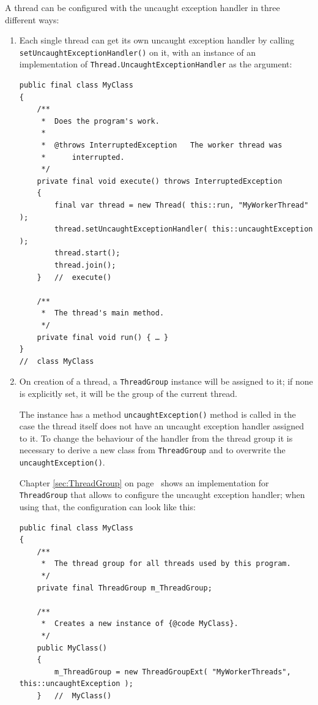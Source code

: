 \documentclass[11pt,a4paper, titlepage, parskip=half, headsepline, footsepline, cleardoublepage=current, headheight=1cm]{scrbook}
\newcommand*{\tqvref}[1]{\hyperref[{#1}]{\ref*{#1}} on page~\pageref{#1}}
\begin{document}
A thread can be configured with the uncaught exception handler in three different ways:
\begin{enumerate}
\item{Each single thread can get its own uncaught exception handler by calling \lstinline|setUncaughtExceptionHandler()|\autocite{ORACLE_DOC_THREAD:setUncaughtExceptionHandler} on it, with an instance of an implementation of \lstinline|Thread.UncaughtExceptionHandler| as the argument:
\begin{lstlisting}
public final class MyClass
{
    /**
     *  Does the program's work.
     *
     *  @throws InterruptedException   The worker thread was
     *      interrupted.
     */
    private final void execute() throws InterruptedException
    {
        final var thread = new Thread( this::run, "MyWorkerThread" );
        thread.setUncaughtExceptionHandler( this::uncaughtException );
        thread.start();
        thread.join();
    }   //  execute()
     
    /**
     *  The thread's main method.
     */
    private final void run() { … }
}
//  class MyClass
\end{lstlisting}
}
\item{On creation of a thread, a \lstinline|ThreadGroup|\autocite{ORACLE_DOC_THREADGROUP_CLASS} instance will be assigned to it; if none is explicitly set, it will be the group of the current thread.

The instance has a method \lstinline|uncaughtException()|\autocite{ORACLE_DOC_THREADGROUP:uncaughtException} method is called in the case the thread itself does not have an uncaught exception handler assigned to it. To change the behaviour of the handler from the thread group it is necessary to derive a new class from \lstinline|ThreadGroup| and to overwrite the \lstinline|uncaughtException()|.

Chapter \tqvref{sec:ThreadGroup} shows an implementation for \lstinline|ThreadGroup| that allows to configure the uncaught exception handler; when using that, the configuration can look like this:
\begin{lstlisting}
public final class MyClass
{
    /**
     *  The thread group for all threads used by this program.
     */
    private final ThreadGroup m_ThreadGroup;
    
    /**
     *  Creates a new instance of {@code MyClass}.
     */
    public MyClass()
    {
        m_ThreadGroup = new ThreadGroupExt( "MyWorkerThreads", this::uncaughtException );
    }   //  MyClass()
    

\end{lstlisting}}
\end{enumerate}
\end{document}
